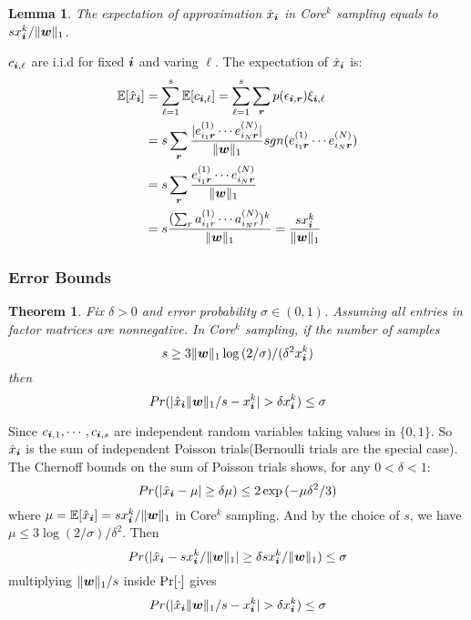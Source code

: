 \documentclass[10pt,journal,compsoc]{IEEEtran}
\newcommand{\Sca}[3]{{#1}^{(#2)}_{i_#2#3}}%
\newcommand{\anr}[2]{\Sca{a}{#1}{#2}}
\newcommand{\enr}[2]{\Sca{e}{#1}{\V{#2}}}
\newcommand{\score}[1]{\xi_{\V{i},#1}}
\newcommand{\V}[1]{{\boldsymbol{{\MakeLowercase{#1}}}}}
\newcommand{\predx}{\hat{x}_{\V{i}}}
\newcommand{\norm}[2]{\|#1\|_{#2}}
\newtheorem{lemma}{Lemma}
\newtheorem{theorem}{Theorem}
\begin{document}
\begin{lemma}\label{lem:Expectation}
	The expectation of approximation $\hat{x}_{\V{i}}$ in Core$^k$ sampling equals to $sx^k_{\V{i}}/\norm{\V{w}}{1}$.
\end{lemma}
\begin{IEEEproof}
	$c_{\V{i},\ell}$ are i.i.d for fixed $\V{i}$ and varing $\ell$. 
	The expectation of $\predx$ is:
	\begin{align*}
	\mathbb{E}[\predx]
	& = \sum_{\ell=1}^{s}\mathbb{E}[c_{\V{i},\ell}] = \sum_{\ell=1}^{s}\sum_{\V{r}} p(\epsilon_{\V{i},\V{r}})\score{\ell} \\
	& = s\sum_{\V{r}} \frac{|\enr{1}{r}\cdots\enr{N}{r}|}{\norm{\V{W}}{1}}
	sgn(\enr{1}{r}\cdots\enr{N}{r})\\
	& = s\sum_{\V{r}} \frac{\enr{1}{r}\cdots\enr{N}{r}}{\norm{\V{W}}{1}}\\
	& = s\frac{(\sum_{r}\anr{1}{r}\cdots\anr{N}{r})^k}{\norm{\V{W}}{1}}
	= \frac{sx^k_{\V{i}}}{\norm{\V{w}}{1}}
	\end{align*}
\end{IEEEproof}

\subsubsection{Error Bounds}

\begin{theorem}\label{theo:Bound}
	Fix $\delta > 0$ and error probability $\sigma \in (0,1)$.
	Assuming all entries in factor matrices are nonnegative.
	In Core$^k$ sampling, if the number of samples
	\[
	s \geq 3\norm{\V{w}}{1}\log{(2/\sigma)}/(\delta^2 x^k_{\V{i}})
	\]
	then
	\[
	Pr(|\predx\norm{\V{W}}{1}/s - x^k_{\V{i}}| > \delta x^k_{\V{i}}) \leq \sigma
	\]
\end{theorem}

\begin{IEEEproof}
	Since  $c_{\V{i},1},\cdots,c_{\V{i},s}$
	are independent random variables taking values in $\{0,1\}$.
	So $\predx$ is the sum of independent Poisson trials(Bernoulli trials are the special case).
	The Chernoff bounds on the sum of Poisson trials shows, for any $0 <\delta <1 $:
	\[
	Pr(|\predx - \mu|\geq\delta\mu) \leq 2\exp{(-\mu\delta^2/3)}
	\]
	where $\mu=\mathbb{E}[\predx]=sx^k_{\V{i}}/\norm{\V{W}}{1}$ in Core$^k$ sampling.
	And by the choice of $s$, we have
	$\mu\leq 3\log{(2/\sigma)/\delta^2}$.
	Then
	\[
	Pr(|\predx-sx^k_{\V{i}}/\norm{\V{W}}{1}|\geq\delta sx^k_{\V{i}}/\norm{\V{W}}{1}) \leq \sigma
	\]
	multiplying $\norm{\V{W}}{1}/s$ inside ${\rm Pr}[\cdot]$ gives
	\[
	Pr(|\predx\norm{\V{W}}{1}/s - x^k_{\V{i}}| > \delta x^k_{\V{i}}) \leq \sigma
	\]
\end{IEEEproof}
\end{document}
